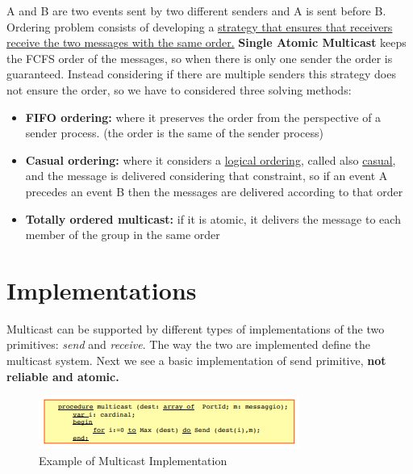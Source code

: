 A and B are two events sent by two different senders and A is sent before B. Ordering problem consists of developing a \ul{strategy that ensures that receivers receive the two messages with the same order.} \textbf{Single Atomic Multicast} keeps the FCFS order of the messages, so when there is only one sender the order is guaranteed. Instead considering if there are multiple senders this strategy does not ensure the order, so we have to considered three solving methods:
\begin{itemize}
    \item \textbf{FIFO ordering:}  where it preserves the order from the perspective of a sender process. (the order is the same of the sender process)
    \item \textbf{Casual ordering:} where it considers a \underline{logical ordering}, called also \underline{casual}, and the message is delivered considering that constraint, so if an event A precedes an event B then the messages are delivered according to that order
    \item \textbf{Totally ordered multicast:} if it is atomic, it delivers the message to each member of the group in the same order
\end{itemize}

\section{Implementations}
Multicast can be supported by different types of implementations of the two primitives: \textit{send}  and \textit{receive}. The way the two are implemented define the multicast system. Next we see a basic implementation of send primitive, \textbf{not reliable and atomic.}

\begin{figure}[!h]
    \centering
    \includegraphics[width=.7\linewidth]{images/multicastCommunication/multicastimplementation.png}
    \caption{Example of Multicast Implementation}
\end{figure}

